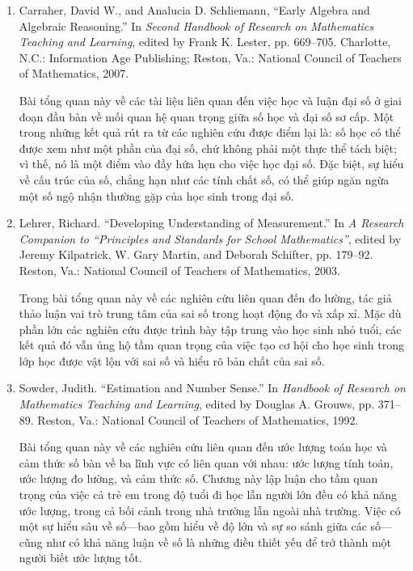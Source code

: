 \documentclass[
  10pt,
  a4paper,
  landscape,
  twoside,
  openany
]{scrbook}
\newcommand{\VI}[1]{#1}
\begin{document}
{
\VI{
  \begin{enumerate}
    \item Carraher, David W., and Analucia D. Schliemann, ``Early Algebra and Algebraic Reasoning.'' In \emph{Second Handbook of Research on Mathematics Teaching and Learning}, edited by Frank K. Lester, pp. 669--705. Charlotte, N.C.: Information Age Publishing; Reston, Va.: National Council of Teachers of Mathematics, 2007.
    
      Bài tổng quan này về các tài liệu liên quan đến việc học và luận đại số ở giai đoạn đầu bàn về mối quan hệ quan trọng giữa số học và đại số sơ cấp. Một trong những kết quả rút ra từ các nghiên cứu được điểm lại là: số học có thể được xem như một phần của đại số, chứ không phải một thực thể tách biệt; vì thế, nó là một điểm vào đầy hứa hẹn cho việc học đại số. Đặc biệt, sự hiểu về cấu trúc của số, chẳng hạn như các tính chất số, có thể giúp ngăn ngừa một số ngộ nhận thường gặp của học sinh trong đại số.

    \item Lehrer, Richard. ``Developing Understanding of Measurement.'' In \emph{A Research Companion to ``Principles and Standards for School Mathematics''}, edited by Jeremy Kilpatrick, W. Gary Martin, and Deborah Schifter, pp. 179--92. Reston, Va.: National Council of Teachers of Mathematics, 2003.

      Trong bài tổng quan này về các nghiên cứu liên quan đến đo lường, tác giả thảo luận vai trò trung tâm của sai số trong hoạt động đo và xấp xỉ. Mặc dù phần lớn các nghiên cứu được trình bày tập trung vào học sinh nhỏ tuổi, các kết quả đó vẫn ủng hộ tầm quan trọng của việc tạo cơ hội cho học sinh trong lớp học được vật lộn với sai số và hiểu rõ bản chất của sai số.

    \item Sowder, Judith. ``Estimation and Number Sense.'' In \emph{Handbook of Research on Mathematics Teaching and Learning}, edited by Douglas A. Grouws, pp. 371--89. Reston, Va.: National Council of Teachers of Mathematics, 1992.

      Bài tổng quan này về các nghiên cứu liên quan đến ước lượng toán học và cảm thức số bàn về ba lĩnh vực có liên quan với nhau: ước lượng tính toán, ước lượng đo lường, và cảm thức số. Chương này lập luận cho tầm quan trọng của việc cả trẻ em trong độ tuổi đi học lẫn người lớn đều có khả năng ước lượng, trong cả bối cảnh trong nhà trường lẫn ngoài nhà trường. Việc có một sự hiểu sâu về số---bao gồm hiểu về độ lớn và sự so sánh giữa các số---cũng như có khả năng luận về số là những điều thiết yếu để trở thành một người biết ước lượng tốt.


\end{enumerate}}}
\end{document}
